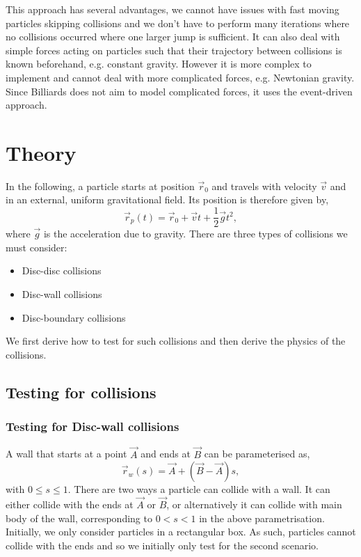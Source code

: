 \documentclass{article}
\begin{document}
This approach has several advantages, we cannot have issues with fast moving particles skipping collisions and we don't have to perform many iterations where no collisions occurred where one larger jump is sufficient. It can also deal with simple forces acting on particles such that their trajectory between collisions is known beforehand, e.g. constant gravity. However it is more complex to implement and cannot deal with more complicated forces, e.g. Newtonian gravity. Since Billiards does not aim to model complicated forces, it uses the event-driven approach.

\section{Theory}

In the following, a particle starts at position $\vec{r}_0$ and travels with velocity $\vec{v}$ and in an external, uniform gravitational field. Its position is therefore given by,
\begin{equation}
    \vec{r}_p(t)
    =
    \vec{r}_0 + \vec{v}t + \frac{1}{2} \vec{g} t^2,
\end{equation}
where $\vec{g}$ is the acceleration due to gravity.
There are three types of collisions we must consider:
\begin{itemize}
    \item Disc-disc collisions
    \item Disc-wall collisions
    \item Disc-boundary collisions
\end{itemize}
We first derive how to test for such collisions and then derive the physics of the collisions.

\subsection{Testing for collisions}

\subsubsection{Testing for Disc-wall collisions}
A wall that starts at a point $\vec{A}$ and ends at $\vec{B}$ can be parameterised as,
\begin{equation}
    \vec{r}_w(s)
    =
    \vec{A} + (\vec{B} - \vec{A}) s,
\end{equation}
with $0 \leq s \leq 1$. There are two ways a particle can collide with a wall. It can either collide with the ends at $\vec{A}$ or $\vec{B}$, or alternatively it can collide with main body of the wall, corresponding to $0 < s < 1$ in the above parametrisation. Initially, we only consider particles in a rectangular box. As such, particles cannot collide with the ends and so we initially only test for the second scenario.
\end{document}
